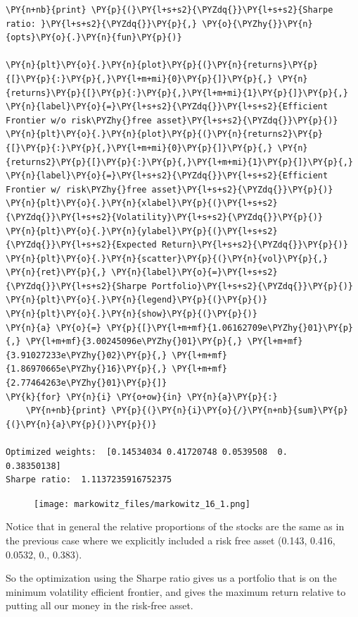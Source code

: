 \begin{tcolorbox}[breakable, size=fbox, boxrule=1pt, pad at break*=1mm,colback=cellbackground, colframe=cellborder]
\begin{Verbatim}[commandchars=\\\{\}]
\PY{n+nb}{print} \PY{p}{(}\PY{l+s+s2}{\PYZdq{}}\PY{l+s+s2}{Sharpe ratio: }\PY{l+s+s2}{\PYZdq{}}\PY{p}{,} \PY{o}{\PYZhy{}}\PY{n}{opts}\PY{o}{.}\PY{n}{fun}\PY{p}{)}

\PY{n}{plt}\PY{o}{.}\PY{n}{plot}\PY{p}{(}\PY{n}{returns}\PY{p}{[}\PY{p}{:}\PY{p}{,}\PY{l+m+mi}{0}\PY{p}{]}\PY{p}{,} \PY{n}{returns}\PY{p}{[}\PY{p}{:}\PY{p}{,}\PY{l+m+mi}{1}\PY{p}{]}\PY{p}{,} \PY{n}{label}\PY{o}{=}\PY{l+s+s2}{\PYZdq{}}\PY{l+s+s2}{Efficient Frontier w/o risk\PYZhy{}free asset}\PY{l+s+s2}{\PYZdq{}}\PY{p}{)}
\PY{n}{plt}\PY{o}{.}\PY{n}{plot}\PY{p}{(}\PY{n}{returns2}\PY{p}{[}\PY{p}{:}\PY{p}{,}\PY{l+m+mi}{0}\PY{p}{]}\PY{p}{,} \PY{n}{returns2}\PY{p}{[}\PY{p}{:}\PY{p}{,}\PY{l+m+mi}{1}\PY{p}{]}\PY{p}{,} \PY{n}{label}\PY{o}{=}\PY{l+s+s2}{\PYZdq{}}\PY{l+s+s2}{Efficient Frontier w/ risk\PYZhy{}free asset}\PY{l+s+s2}{\PYZdq{}}\PY{p}{)}
\PY{n}{plt}\PY{o}{.}\PY{n}{xlabel}\PY{p}{(}\PY{l+s+s2}{\PYZdq{}}\PY{l+s+s2}{Volatility}\PY{l+s+s2}{\PYZdq{}}\PY{p}{)}
\PY{n}{plt}\PY{o}{.}\PY{n}{ylabel}\PY{p}{(}\PY{l+s+s2}{\PYZdq{}}\PY{l+s+s2}{Expected Return}\PY{l+s+s2}{\PYZdq{}}\PY{p}{)}
\PY{n}{plt}\PY{o}{.}\PY{n}{scatter}\PY{p}{(}\PY{n}{vol}\PY{p}{,} \PY{n}{ret}\PY{p}{,} \PY{n}{label}\PY{o}{=}\PY{l+s+s2}{\PYZdq{}}\PY{l+s+s2}{Sharpe Portfolio}\PY{l+s+s2}{\PYZdq{}}\PY{p}{)}
\PY{n}{plt}\PY{o}{.}\PY{n}{legend}\PY{p}{(}\PY{p}{)}
\PY{n}{plt}\PY{o}{.}\PY{n}{show}\PY{p}{(}\PY{p}{)}
\PY{n}{a} \PY{o}{=} \PY{p}{[}\PY{l+m+mf}{1.06162709e\PYZhy{}01}\PY{p}{,} \PY{l+m+mf}{3.00245096e\PYZhy{}01}\PY{p}{,} \PY{l+m+mf}{3.91027233e\PYZhy{}02}\PY{p}{,} \PY{l+m+mf}{1.86970665e\PYZhy{}16}\PY{p}{,} \PY{l+m+mf}{2.77464263e\PYZhy{}01}\PY{p}{]}
\PY{k}{for} \PY{n}{i} \PY{o+ow}{in} \PY{n}{a}\PY{p}{:}
    \PY{n+nb}{print} \PY{p}{(}\PY{n}{i}\PY{o}{/}\PY{n+nb}{sum}\PY{p}{(}\PY{n}{a}\PY{p}{)}\PY{p}{)}

Optimized weights:  [0.14534034 0.41720748 0.0539508  0.         0.38350138]
Sharpe ratio:  1.1137235916752375
    \end{Verbatim}
\end{tcolorbox}

    \begin{figure}
    \centering
    \texttt{[image: markowitz\_files/markowitz\_16\_1.png]}
    \end{figure}
    
    Notice that in general the relative proportions of the stocks are the
same as in the previous case where we explicitly included a risk free
asset (0.143, 0.416, 0.0532, 0., 0.383).

So the optimization using the Sharpe ratio gives us a portfolio that is
on the minimum volatility efficient frontier, and gives the maximum
return relative to putting all our money in the risk-free asset.

